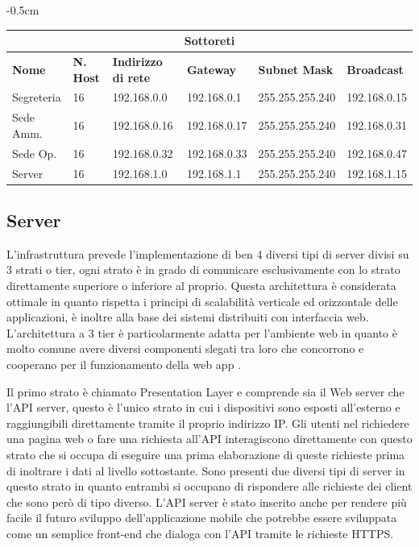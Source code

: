\begin{center}
    \addtolength{\leftskip} {-0.5cm}
    \begin{tabular}{ |p{2.1cm}|p{1cm}|p{2.1cm}|p{2.1cm}|p{2.7cm}|p{2.1cm}| } 
    \hline
    \multicolumn{6}{|c|}{\large\textbf{Sottoreti}} \\
    \hline
    \textbf{Nome} & \textbf{N. Host} & \textbf{Indirizzo di rete} & \textbf{Gateway} & \textbf{Subnet Mask} & \textbf{Broadcast} \\
    \hline
    Segreteria & 16 & 192.168.0.0 & 192.168.0.1 & 255.255.255.240 & 192.168.0.15 \\
    Sede Amm. & 16 & 192.168.0.16 & 192.168.0.17 & 255.255.255.240 & 192.168.0.31 \\
    Sede Op. & 16 & 192.168.0.32 & 192.168.0.33 & 255.255.255.240 & 192.168.0.47 \\
    Server & 16 & 192.168.1.0 & 192.168.1.1 & 255.255.255.240 & 192.168.1.15 \\
    \hline
    \end{tabular}
\end{center}
\subsection{Server}
L'infrastruttura prevede l'implementazione di ben 4 diversi tipi di server divisi su 3 strati o tier, ogni strato è in grado di comunicare esclusivamente con lo strato direttamente superiore o inferiore al proprio. Questa architettura è considerata ottimale in quanto rispetta i principi di scalabilità verticale ed orizzontale delle applicazioni, è inoltre alla base dei sistemi distribuiti con interfaccia web. L'architettura a 3 tier è particolarmente adatta per l'ambiente web in quanto è molto comune avere diversi componenti slegati tra loro che concorrono e cooperano per il funzionamento della web app \cite{3Tier}. 
\medskip

Il primo strato è chiamato Presentation Layer e comprende sia il Web server che l'API server, questo è l'unico strato in cui i dispositivi sono esposti all'esterno e raggiungibili direttamente tramite il proprio indirizzo IP. Gli utenti nel richiedere una pagina web o fare una richiesta all'API interagiscono direttamente con questo strato che si occupa di eseguire una prima elaborazione di queste richieste prima di inoltrare i dati al livello sottostante. Sono presenti due diversi tipi di server in questo strato in quanto entrambi si occupano di rispondere alle richieste dei client che sono però di tipo diverso. L'API server è stato inserito anche per rendere più facile il futuro sviluppo dell'applicazione mobile che potrebbe essere sviluppata come un semplice front-end che dialoga con l'API tramite le richieste HTTPS. 
\medskip

